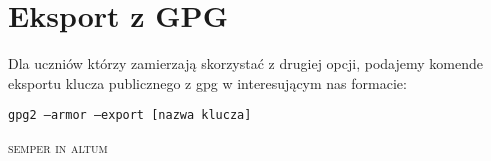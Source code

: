 \section{Eksport z GPG}

Dla uczniów którzy zamierzają skorzystać z drugiej opcji, podajemy komende eksportu klucza publicznego z gpg w interesującym nas formacie:
\begin{center}\texttt{gpg2 --armor --export [nazwa klucza]}\end{center}

\vfill
\begin{center}
\LARGE \scshape semper in altum\end{center}
\vfill
